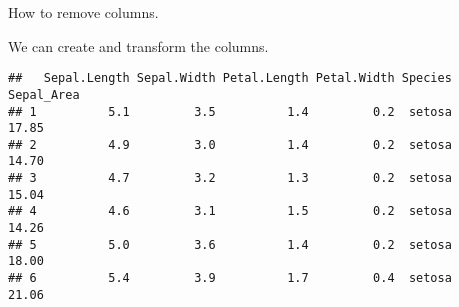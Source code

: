 \documentclass[
]{book}
\newenvironment{Shaded}{\begin{snugshade}}{\end{snugshade}}
\newcommand{\CommentTok}[1]{\textcolor[rgb]{0.56,0.35,0.01}{\textit{#1}}}
\newcommand{\ConstantTok}[1]{\textcolor[rgb]{0.00,0.00,0.00}{#1}}
\newcommand{\DecValTok}[1]{\textcolor[rgb]{0.00,0.00,0.81}{#1}}
\newcommand{\FunctionTok}[1]{\textcolor[rgb]{0.00,0.00,0.00}{#1}}
\newcommand{\NormalTok}[1]{#1}
\newcommand{\OtherTok}[1]{\textcolor[rgb]{0.56,0.35,0.01}{#1}}
\newcommand{\SpecialCharTok}[1]{\textcolor[rgb]{0.00,0.00,0.00}{#1}}
\begin{document}
How to remove columns.

\begin{Shaded}
\end{Shaded}

We can create and transform the columns.

\begin{Shaded}
\end{Shaded}

\begin{verbatim}
##   Sepal.Length Sepal.Width Petal.Length Petal.Width Species Sepal_Area
## 1          5.1         3.5          1.4         0.2  setosa      17.85
## 2          4.9         3.0          1.4         0.2  setosa      14.70
## 3          4.7         3.2          1.3         0.2  setosa      15.04
## 4          4.6         3.1          1.5         0.2  setosa      14.26
## 5          5.0         3.6          1.4         0.2  setosa      18.00
## 6          5.4         3.9          1.7         0.4  setosa      21.06
\end{verbatim}

\begin{Shaded}
\end{Shaded}
\end{document}
